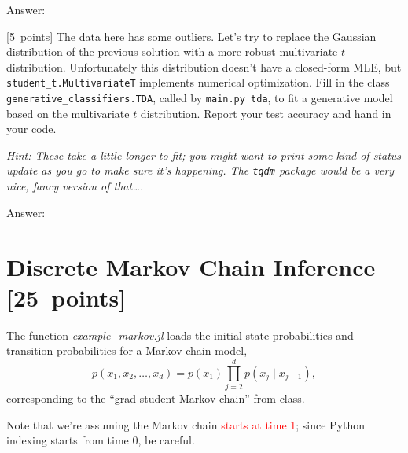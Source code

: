 \documentclass{article}
\newcommand{\ask}[1]{\textcolor{question}{#1}}
\newenvironment{answer}{\par\begingroup\color{answer}Answer: }{\endgroup}
\newcommand{\red}[1]{\textcolor{red}{#1}}
\newcommand{\pts}[1]{\textcolor{points}{[#1~points]}}
\newcommand{\hint}[1]{\textcolor{black!60!white}{\emph{Hint: #1}}}
\newcommand{\TODO}{\color{red}{TODO}}
\begin{document}
\begin{qlist}
\begin{answer}\TODO\end{answer}

\item \pts{5}
    The data here has some outliers.
    Let's try to replace the Gaussian distribution of the previous solution with a more robust multivariate $t$ distribution.
    Unfortunately this distribution doesn't have a closed-form MLE,
    but \texttt{student\_t.MultivariateT} implements numerical optimization.
    Fill in the class \texttt{generative\_classifiers.TDA},
    called by \texttt{main.py tda},
    to fit a generative model based on the multivariate $t$ distribution.
    \ask{Report your test accuracy and hand in your code.}

    \hint{These take a little longer to fit; you might want to print some kind of status update as you go to make sure it's happening. The \texttt{tqdm} package would be a very nice, fancy version of that\dots.}

\begin{answer}\TODO\end{answer}

\end{qlist}





\clearpage
\section{Discrete Markov Chain Inference \pts{25}}

The function \emph{example\_markov.jl} loads the initial state probabilities and transition probabilities for a Markov chain model,
\[
p(x_1,x_2,\dots,x_d) = p(x_1)\prod_{j=2}^{d}{p(x_j\mid x_{j-1})},
\]
corresponding to the ``grad student Markov chain'' from class.

Note that we're assuming the Markov chain \red{starts at time 1};
since Python indexing starts from time 0, be careful.
\end{document}
